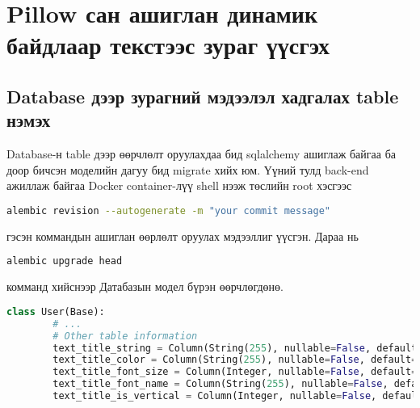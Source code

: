 \section{Pillow сан ашиглан динамик байдлаар текстээс зураг үүсгэх}
\subsection{Database дээр зурагний мэдээлэл хадгалах table нэмэх}
Database-н table дээр өөрчлөлт оруулахдаа бид sqlalchemy ашиглаж байгаа ба доор бичсэн моделийн дагуу бид migrate хийх юм. Үүний тулд back-end ажиллаж байгаа Docker container-лүү shell нээж төслийн root хэсгээс
\begin{lstlisting}[language=bash]
	alembic revision --autogenerate -m "your commit message"
\end{lstlisting}
гэсэн коммандын ашиглан өөрлөлт оруулах мэдээллиг үүсгэн. Дараа нь
\begin{lstlisting}[language=bash]
	alembic upgrade head
\end{lstlisting}
комманд хийснээр Датабазын модел бүрэн өөрчлөгдөнө.

\begin{lstlisting}[language=Python,caption={Table-рүү оруулсан өөрчлөлт},frame=single]
	class User(Base):
		# ...
		# Other table information
		text_title_string = Column(String(255), nullable=False, default="")
		text_title_color = Column(String(255), nullable=False, default="#000000")
		text_title_font_size = Column(Integer, nullable=False, default=0)
		text_title_font_name = Column(String(255), nullable=False, default="")
		text_title_is_vertical = Column(Integer, nullable=False, default=0)
	\end{lstlisting}


